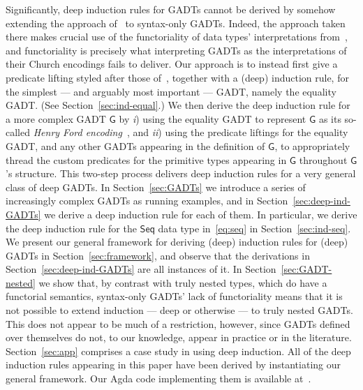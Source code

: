 \documentclass[9pt]{entcs}
\begin{document}
Significantly, deep induction rules for GADTs cannot be derived by
somehow extending the approach of~\cite{jp20} to syntax-only
GADTs. Indeed, the approach taken there makes crucial use of the
functoriality of data types' interpretations from~\cite{jp19}, and
functoriality is precisely what interpreting GADTs as the
interpretations of their Church encodings fails to deliver. Our
approach is to instead first give a predicate lifting styled after
those of~\cite{jp20}, together with a (deep) induction rule, for the
simplest --- and arguably most important --- GADT, namely the equality
GADT. (See Section~\ref{sec:ind-equal}.)  We then derive the deep
induction rule for a more complex GADT $\mathsf{G}$ by {\em i}) using
the equality GADT to represent $\mathsf{G}$ as its so-called {\em
  Henry Ford encoding}~\cite{ch03,hin03,mcb99,sjsv09,sp04}, and {\em
  ii}) using the predicate liftings for the equality GADT, and any
other GADTs appearing in the definition of $\mathsf{G}$, to
appropriately thread the custom predicates for the primitive types
appearing in $\mathsf{G}$ throughout $\mathsf{G}$'s structure. This
two-step process delivers deep induction rules for a very general
class of deep GADTs. In Section~\ref{sec:GADTs} we introduce a series
of increasingly complex GADTs as running examples, and in
Section~\ref{sec:deep-ind-GADTs} we derive a deep induction rule for
each of them. In particular, we derive the deep induction rule for the
$\mathsf{Seq}$ data type in~\eqref{eq:seq} in
Section~\ref{sec:ind-seq}. We present our general framework for
deriving (deep) induction rules for (deep) GADTs in
Section~\ref{sec:framework}, and observe that the derivations in
Section~\ref{sec:deep-ind-GADTs} are all instances of it.  In
Section~\ref{sec:GADT-nested} we show that, by contrast with truly
nested types, which do have a functorial semantics, syntax-only GADTs'
lack of functoriality means that it is not possible to extend
induction --- deep or otherwise --- to truly nested GADTs. This does
not appear to be much of a restriction, however, since GADTs defined
over themselves do not, to our knowledge, appear in practice or in the
literature. Section~\ref{sec:app} comprises a case study in using deep
induction. All of the deep induction rules appearing in this paper
have been derived by instantiating our general framework. Our Agda
code implementing them is available at~\cite{web-page}.

\end{document}
